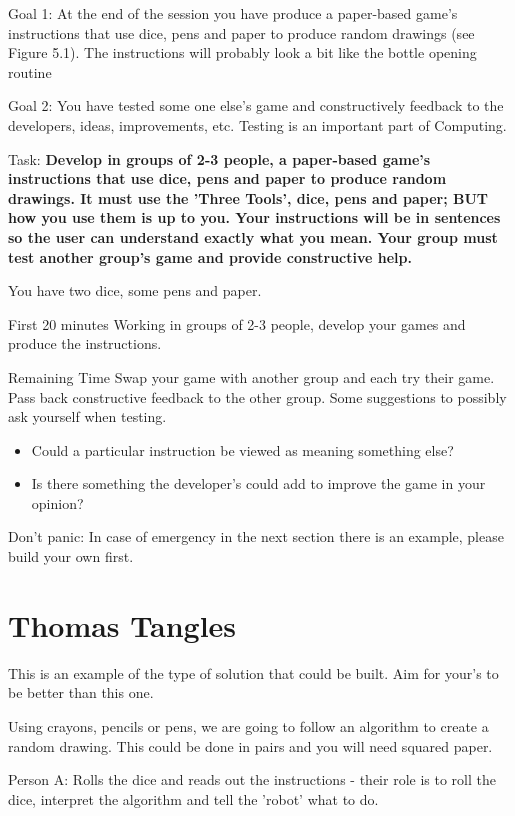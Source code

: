 Goal 1: At the end of the session you have produce a paper-based game's instructions that use dice, pens and paper to produce random drawings (see Figure 5.1). The instructions will probably look a bit like the bottle opening routine 

Goal 2: You have tested some one else's game and constructively feedback to the developers, ideas, improvements, etc. Testing is an important part of Computing.


Task: \textbf{Develop in groups of 2-3 people, a paper-based game's instructions that use dice, pens and paper to produce random drawings. It must use the 'Three Tools', dice, pens and paper; BUT how you use them is up to you. Your instructions will be in sentences so the user can understand exactly what you mean. Your group must test another group's game and provide constructive help.} 


You have two dice, some pens and paper.

First 20 minutes
Working in groups of 2-3 people, develop your games and produce the instructions.

Remaining Time
Swap your game with another group and each try their game. Pass back constructive feedback to the other group. Some suggestions to possibly ask yourself when testing.
\begin{itemize}
    \item Could a particular instruction be viewed as meaning something else?
    \item Is there something the developer's could add to improve the game in your opinion?
\end{itemize}

Don't panic: In case of emergency in the next section there is an example, please build your own first.
\newline
\newline
\section{Thomas Tangles}
This is an example of the type of solution that could be built. Aim for your's to be better than this one.

Using crayons, pencils or pens, we are going to follow an algorithm to create a random drawing. This could be done in pairs and you will need squared paper. 

Person A: Rolls the dice and reads out the instructions - their role is to roll the dice, interpret the algorithm and tell the 'robot' what to do.

